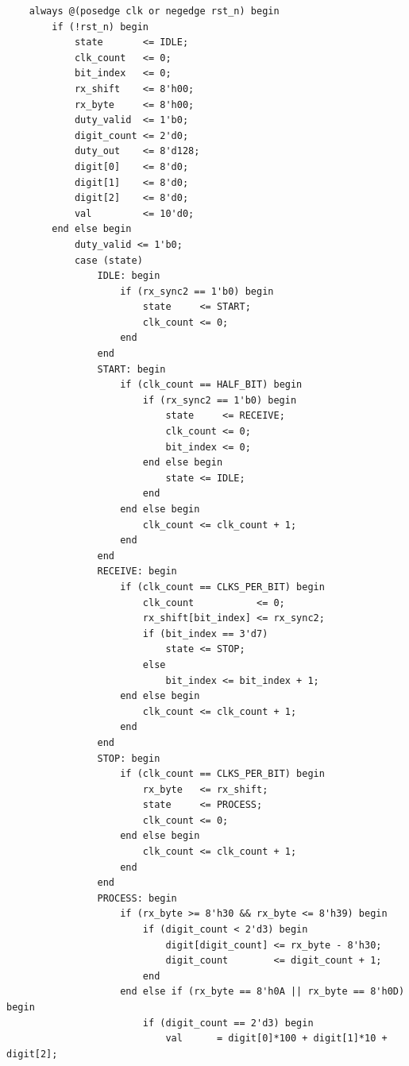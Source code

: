 \documentclass[12pt,a4paper]{article}
\begin{document}
\begin{lstlisting}
    always @(posedge clk or negedge rst_n) begin
        if (!rst_n) begin
            state       <= IDLE;
            clk_count   <= 0;
            bit_index   <= 0;
            rx_shift    <= 8'h00;
            rx_byte     <= 8'h00;
            duty_valid  <= 1'b0;
            digit_count <= 2'd0;
            duty_out    <= 8'd128;
            digit[0]    <= 8'd0;
            digit[1]    <= 8'd0;
            digit[2]    <= 8'd0;
            val         <= 10'd0;
        end else begin
            duty_valid <= 1'b0;
            case (state)
                IDLE: begin
                    if (rx_sync2 == 1'b0) begin
                        state     <= START;
                        clk_count <= 0;
                    end
                end
                START: begin
                    if (clk_count == HALF_BIT) begin
                        if (rx_sync2 == 1'b0) begin
                            state     <= RECEIVE;
                            clk_count <= 0;
                            bit_index <= 0;
                        end else begin
                            state <= IDLE;
                        end
                    end else begin
                        clk_count <= clk_count + 1;
                    end
                end
                RECEIVE: begin
                    if (clk_count == CLKS_PER_BIT) begin
                        clk_count           <= 0;
                        rx_shift[bit_index] <= rx_sync2;
                        if (bit_index == 3'd7)
                            state <= STOP;
                        else
                            bit_index <= bit_index + 1;
                    end else begin
                        clk_count <= clk_count + 1;
                    end
                end
                STOP: begin
                    if (clk_count == CLKS_PER_BIT) begin
                        rx_byte   <= rx_shift;
                        state     <= PROCESS;
                        clk_count <= 0;
                    end else begin
                        clk_count <= clk_count + 1;
                    end
                end
                PROCESS: begin
                    if (rx_byte >= 8'h30 && rx_byte <= 8'h39) begin
                        if (digit_count < 2'd3) begin
                            digit[digit_count] <= rx_byte - 8'h30;
                            digit_count        <= digit_count + 1;
                        end
                    end else if (rx_byte == 8'h0A || rx_byte == 8'h0D) begin
                        if (digit_count == 2'd3) begin
                            val      = digit[0]*100 + digit[1]*10 + digit[2];

\end{lstlisting}
\end{document}

